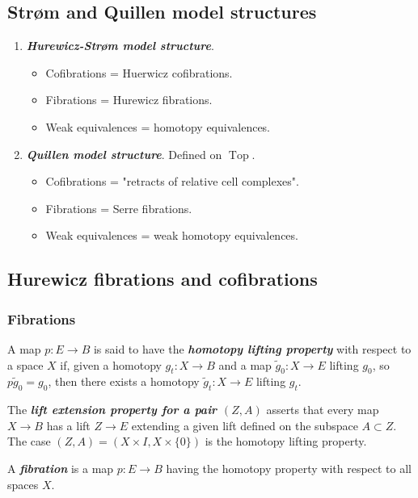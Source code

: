 \subsection*{Str\o m and Quillen model structures}

\begin{example}\leavevmode
\begin{enumerate}
	\item \textbf{\textit{Hurewicz-Str\o m model structure}}.
	\begin{itemize}
		\item Cofibrations = Huerwicz cofibrations.
		\item Fibrations = Hurewicz fibrations.
		\item Weak equivalences = homotopy equivalences.
	\end{itemize}
	\item \textbf{\textit{Quillen model structure}}. Defined on $\operatorname{Top}$.
	\begin{itemize}
		\item Cofibrations = "retracts of relative cell complexes".
		\item Fibrations = Serre fibrations.
		\item Weak equivalences = weak homotopy equivalences.
	\end{itemize}
\end{enumerate}
\end{example}

\subsection{Hurewicz fibrations and cofibrations}

\subsubsection{Fibrations}

\begin{defn}[Hatcher]
	 A map $p:E\to B$ is said to have the \textbf{\textit{homotopy lifting property}} with respect to a space $X$ if, given a homotopy $g_t:X\to B$ and a map $\tilde{g}_0:X\to E$ lifting $g_0$, so $p\tilde{g}_0=g_0$, then there exists a homotopy $\tilde{g}_t:X\to E$ lifting $g_t$.
	
	The \textbf{\textit{lift extension property for a pair $(Z,A)$}} asserts that every map $X\to B$ has a lift $Z\to E$ extending a given lift defined on the subspace $A\subset Z$. The case $(Z,A)=(X\times I,X\times\{0\})$ is the homotopy lifting property.
	
	A \textbf{\textit{fibration}} is a map $p:E\to B$ having the homotopy property with respect to all spaces $X$.
\end{defn}

